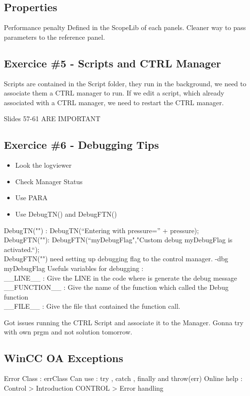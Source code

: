 \documentclass[a4paper, 10pt]{article}
\begin{document}
\subsection{Properties}
Performance penalty
Defined in the ScopeLib of each panels.
Cleaner way to pass parameters to the reference panel.

\subsection{Exercice \#5 - Scripts and CTRL Manager}
Scripts are contained in the Script folder, they run in the background, we need to associate them a CTRL manager to run.
If we edit a script, which already associated with a CTRL manager, we need to restart the CTRL manager.

Slides 57-61 ARE IMPORTANT

\subsection{Exercice \#6 - Debugging Tips}
\begin{itemize}
    \item Look the logviewer
    \item Check Manager Status
    \item Use PARA
    \item Use DebugTN() and DebugFTN()
\end{itemize}
DebugTN("") : DebugTN(“Entering with pressure=” + pressure);\\
DebugFTN(""): DebugFTN(“myDebugFlag","Custom debug myDebugFlag is activated.“);\\
DebugFTN("") need setting up debugging flag to the control manager. -dbg myDebugFlag
Usefuls variables for debugging :\\
\_\_LINE\_\_ : Give the LINE in the code where is generate the debug message\\
\_\_FUNCTION\_\_ : Give the name of the function which called the Debug function\\
\_\_FILE\_\_ : Give the file that contained the function call.

Got issues running the CTRL Script and associate it to the Manager.
Gonna try with own prgm and not solution tomorrow.

\subsection{WinCC OA Exceptions}
Error Class : errClass
Can use : try { }, catch { }, finally { } and throw(err)
Online help : Control > Introduction CONTROL > Error handling
\end{document}
